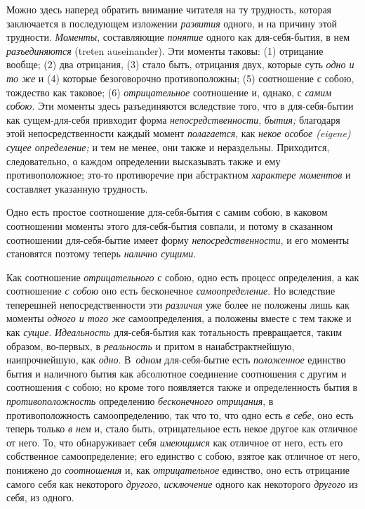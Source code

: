 Можно здесь наперед обратить внимание читателя на ту трудность, которая
заключается в последующем изложении {\em развития}
одного, и на причину этой трудности. {\em Моменты},
составляющие {\em понятие} одного как для-себя-бытия, в
нем {\em разъединяются} (treten auseinander). Эти
моменты таковы: (1) отрицание вообще; (2) два отрицания, (3) стало быть,
отрицания двух, которые суть {\em одно и то же} и (4)
которые безоговорочно противоположны; (5) соотношение с собою, тождество
как таковое; (6) {\em отрицательное} соотношение и,
однако, с {\em самим собою}. Эти моменты здесь
разъединяются вследствие того, что в для-себя-бытии как сущем-для-себя
привходит форма {\em непосредственности},
{\em бытия;} благодаря этой непосредственности каждый
момент {\em полагается}, как
{\em некое особое (eigene) сущее определение;} и тем не
менее, они также и нераздельны. Приходится, следовательно, о каждом
определении высказывать также и ему противоположное; это-то противоречие
при абстрактном {\em характере моментов} и составляет указанную трудность.


Одно есть простое соотношение для-себя-бытия с самим собою, в каковом
соотношении моменты этого для-себя-бытия совпали, и потому в сказанном
соотношении для-себя-бытие имеет форму
{\em непосредственности}, и его моменты становятся
поэтому теперь {\em налично сущими}.

Как соотношение {\em отрицательного} с собою, одно есть
процесс определения, а как соотношение {\em с собою}
оно есть бесконечное {\em самоопределение}. Но
вследствие теперешней непосредственности эти
{\em различия} уже более не положены лишь как моменты
{\em одного и того же} самоопределения, а положены
вместе с тем также и как {\em сущие}.
{\em Идеальность} для-себя-бытия как тотальность
превращается, таким образом, во-первых, в
{\em реальность} и притом в наиабстрактнейшую,
наипрочнейшую, как {\em одно}. В~{\em одном} для-себя-бытие есть
{\em положенное} единство бытия и наличного бытия как
абсолютное соединение соотношения с другим и соотношения с собою; но кроме
того появляется также и определенность бытия в
{\em противоположность} определению
{\em бесконечного отрицания}, в противоположность
самоопределению, так что то, что одно есть {\em в
себе}, оно есть теперь только {\em в нем} и, стало
быть, отрицательное есть некое другое как отличное от него. То, что
обнаруживает себя {\em имеющимся} как отличное от него,
есть его собственное самоопределение; его единство с собою, взятое как
отличное от него, понижено до {\em соотношения} и, как
{\em отрицательное} единство, оно есть отрицание самого
себя как некоторого {\em другого}, {\em исключение} одного как некоторого
{\em другого} из себя, из одного.

